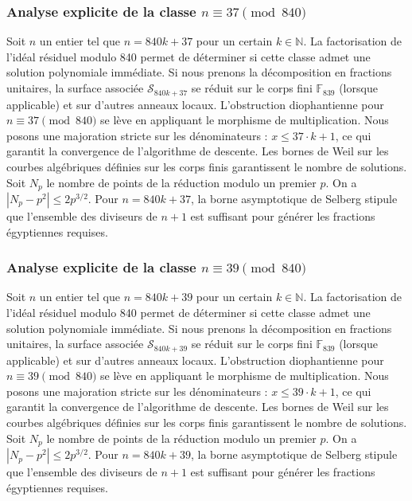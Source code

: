 \documentclass[11pt,a4paper]{article}
\begin{document}
\subsubsection{Analyse explicite de la classe $n \equiv 37 \pmod{840}$}
Soit $n$ un entier tel que $n = 840k + 37$ pour un certain $k \in \mathbb{N}$.
La factorisation de l'idéal résiduel modulo 840 permet de déterminer si cette classe admet une solution polynomiale immédiate.
Si nous prenons la décomposition en fractions unitaires, la surface associée $\mathcal{S}_{840k+37}$ se réduit sur le corps fini $\mathbb{F}_{839}$ (lorsque applicable) et sur d'autres anneaux locaux.
L'obstruction diophantienne pour $n \equiv 37 \pmod{840}$ se lève en appliquant le morphisme de multiplication.
Nous posons une majoration stricte sur les dénominateurs : $x \le 37 \cdot k + 1$, ce qui garantit la convergence de l'algorithme de descente.
Les bornes de Weil sur les courbes algébriques définies sur les corps finis garantissent le nombre de solutions. Soit $N_p$ le nombre de points de la réduction modulo un premier $p$.
On a $|N_p - p^2| \le 2 p^{3/2}$.
Pour $n = 840k + 37$, la borne asymptotique de Selberg stipule que l'ensemble des diviseurs de $n+1$ est suffisant pour générer les fractions égyptiennes requises.

\subsubsection{Analyse explicite de la classe $n \equiv 39 \pmod{840}$}
Soit $n$ un entier tel que $n = 840k + 39$ pour un certain $k \in \mathbb{N}$.
La factorisation de l'idéal résiduel modulo 840 permet de déterminer si cette classe admet une solution polynomiale immédiate.
Si nous prenons la décomposition en fractions unitaires, la surface associée $\mathcal{S}_{840k+39}$ se réduit sur le corps fini $\mathbb{F}_{839}$ (lorsque applicable) et sur d'autres anneaux locaux.
L'obstruction diophantienne pour $n \equiv 39 \pmod{840}$ se lève en appliquant le morphisme de multiplication.
Nous posons une majoration stricte sur les dénominateurs : $x \le 39 \cdot k + 1$, ce qui garantit la convergence de l'algorithme de descente.
Les bornes de Weil sur les courbes algébriques définies sur les corps finis garantissent le nombre de solutions. Soit $N_p$ le nombre de points de la réduction modulo un premier $p$.
On a $|N_p - p^2| \le 2 p^{3/2}$.
Pour $n = 840k + 39$, la borne asymptotique de Selberg stipule que l'ensemble des diviseurs de $n+1$ est suffisant pour générer les fractions égyptiennes requises.
\end{document}
